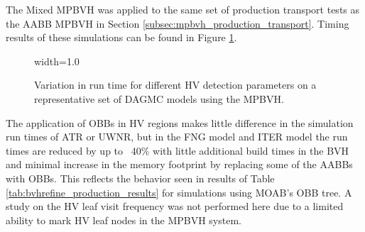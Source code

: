 The Mixed MPBVH was applied to the same set of production transport tests as the
AABB MPBVH in Section \ref{subsec:mpbvh_production_transport}. Timing results of
these simulations can be found in Figure \ref{fig:hv_parameter_study_mpbvh}.

\begin{figure}[H]
  \centering
  {width=1.0\textwidth}
  \caption[High valence detection parameter study using the MPBVH.]{Variation in run time for
    different HV detection parameters on a representative set of DAGMC models
    using the MPBVH.}
  \label{fig:hv_parameter_study_mpbvh}
\end{figure}

The application of OBBs in HV regions makes little difference in the simulation
run times of ATR or UWNR, but in the FNG model and ITER model the run times are
reduced by up to ~40\% with little additional build times in the BVH and
minimal increase in the memory footprint by replacing some of the AABBs with
OBBs. This reflects the behavior seen in results of Table
\ref{tab:bvhrefine_production_results} for simulations using MOAB's OBB tree. A
study on the HV leaf visit frequency was not performed here due to a limited
ability to mark HV leaf nodes in the MPBVH system.



